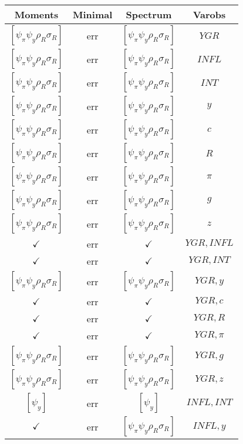 \documentclass[a4paper,10pt]{article}
\begin{document}
\centering
\begin{longtable}{|c|c|c|c|}
\hline
Moments & Minimal & Spectrum & Varobs \\
\hline
$[\psi_\pi \psi_y \rho_R \sigma_R ]$ & err & $[\psi_\pi \psi_y \rho_R \sigma_R ]$ & ${YGR}$ \\
\hline
$[\psi_\pi \psi_y \rho_R \sigma_R ]$ & err & $[\psi_\pi \psi_y \rho_R \sigma_R ]$ & ${INFL}$ \\
\hline
$[\psi_\pi \psi_y \rho_R \sigma_R ]$ & err & $[\psi_\pi \psi_y \rho_R \sigma_R ]$ & ${INT}$ \\
\hline
$[\psi_\pi \psi_y \rho_R \sigma_R ]$ & err & $[\psi_\pi \psi_y \rho_R \sigma_R ]$ & ${y}$ \\
\hline
$[\psi_\pi \psi_y \rho_R \sigma_R ]$ & err & $[\psi_\pi \psi_y \rho_R \sigma_R ]$ & ${c}$ \\
\hline
$[\psi_\pi \psi_y \rho_R \sigma_R ]$ & err & $[\psi_\pi \psi_y \rho_R \sigma_R ]$ & ${R}$ \\
\hline
$[\psi_\pi \psi_y \rho_R \sigma_R ]$ & err & $[\psi_\pi \psi_y \rho_R \sigma_R ]$ & ${\pi}$ \\
\hline
$[\psi_\pi \psi_y \rho_R \sigma_R ]$ & err & $[\psi_\pi \psi_y \rho_R \sigma_R ]$ & ${g}$ \\
\hline
$[\psi_\pi \psi_y \rho_R \sigma_R ]$ & err & $[\psi_\pi \psi_y \rho_R \sigma_R ]$ & ${z}$ \\
\hline
$\checkmark$ & err & $\checkmark$ & ${YGR},{INFL}$ \\
\hline
$\checkmark$ & err & $\checkmark$ & ${YGR},{INT}$ \\
\hline
$[\psi_\pi \psi_y \rho_R \sigma_R ]$ & err & $[\psi_\pi \psi_y \rho_R \sigma_R ]$ & ${YGR},{y}$ \\
\hline
$\checkmark$ & err & $\checkmark$ & ${YGR},{c}$ \\
\hline
$\checkmark$ & err & $\checkmark$ & ${YGR},{R}$ \\
\hline
$\checkmark$ & err & $\checkmark$ & ${YGR},{\pi}$ \\
\hline
$[\psi_\pi \psi_y \rho_R \sigma_R ]$ & err & $[\psi_\pi \psi_y \rho_R \sigma_R ]$ & ${YGR},{g}$ \\
\hline
$[\psi_\pi \psi_y \rho_R \sigma_R ]$ & err & $[\psi_\pi \psi_y \rho_R \sigma_R ]$ & ${YGR},{z}$ \\
\hline
$[\psi_y ]$ & err & $[\psi_y ]$ & ${INFL},{INT}$ \\
\hline
$\checkmark$ & err & $[\psi_\pi \psi_y \rho_R \sigma_R ]$ & ${INFL},{y}$ \\
\hline

\end{longtable}
\end{document}
